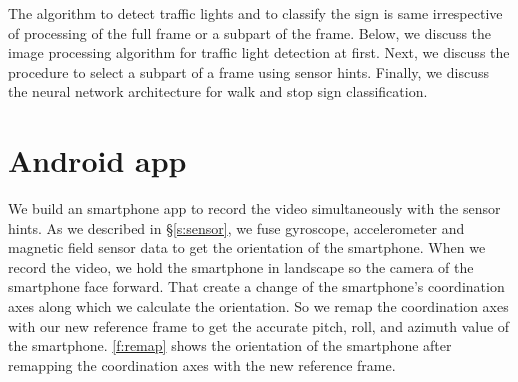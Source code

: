 The algorithm to detect traffic lights and to classify the sign is same irrespective of processing of the full frame or a subpart of the frame.
Below, we discuss the image processing algorithm for traffic light detection at first. 
Next, we discuss the procedure to select a subpart of a frame using sensor hints.
Finally, we discuss the neural network architecture for walk and stop sign classification.




\section{Android app}
\label{s:app}
We build an smartphone app to record the video simultaneously with the sensor hints.
As we described in \S\ref{s:sensor}, we fuse gyroscope, accelerometer and magnetic field sensor data to get the orientation of the smartphone.
When we record the video, we hold the smartphone in landscape so the camera of the smartphone face forward.
That create a change of the smartphone's coordination axes along which we calculate the orientation.
So we remap the coordination axes with our new reference frame to get the accurate pitch, roll, and azimuth value of the smartphone.
\ref{f:remap} shows the orientation of the smartphone after remapping the coordination axes with the new reference frame.

